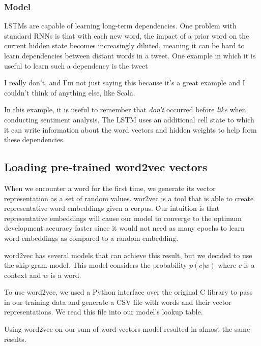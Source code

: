 \documentclass{article} %
\begin{document}
\subsubsection{Model}

LSTMs are capable of learning long-term dependencies. One problem with standard RNNs is that with each new word, the impact of a prior word on the current hidden state becomes increasingly diluted, meaning it can be hard to learn dependencies between distant words in a tweet. One example in which it is useful to learn such a dependency is the tweet

\begin{displayquote}
I really don't, and I'm not just saying this because it's a great example and I couldn't think of anything else, like Scala.
\end{displayquote}

In this example, it is useful to remember that \emph{don't} occurred before \emph{like} when conducting sentiment analysis. The LSTM uses an additional cell state to which it can write information about the word vectors and hidden weights to help form these dependencies.

\subsection{Loading pre-trained word2vec vectors}

When we encounter a word for the first time, we generate its vector representation as a set of random values. wor2vec is a tool that is able to create representative word embeddings given a corpus. Our intuition is that representative embeddings will cause our model to converge to the optimum development accuracy faster since it would not need as many epochs to learn word embeddings as compared to a random embedding. 

word2vec has several models that can achieve this result, but we decided to use the skip-gram model. This model considers the probability $p(c|w)$ where $c$ is a context and $w$ is a word. 

To use word2vec, we used a Python interface over the original C library to pass in our training data and generate a CSV file with words and their vector representations. We read this file into our model's lookup table.

Using word2vec on our sum-of-word-vectors model resulted in almost the same results. 

{}

\end{document}
